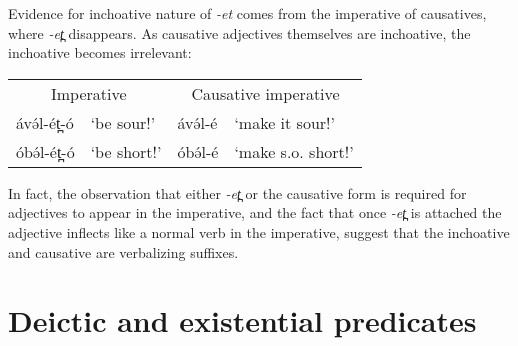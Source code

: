 Evidence for inchoative nature of \textit{-et} comes from the imperative of causatives, where \textit{-et̪} disappears. As causative adjectives themselves are inchoative, the inchoative becomes irrelevant:

\ea	\begin{tabular}[t]{llll}
	\multicolumn{2}{c}{Imperative} & \multicolumn{2}{c}{Causative imperative} \\
ávə́l-ét̪-ó	& ‘be sour!’	& ávə́l-é	& ‘make it sour!’\\
óbə́l-ét̪-ó	& ‘be short!’	&  óbə́l-é	& ‘make s.o. short!’\\
\end{tabular}
\z 
In fact, the observation that either \textit{-et̪} or the causative form is required for adjectives to appear in the imperative, and the fact that once \textit{-et̪} is attached the adjective inflects like a normal verb in the imperative, suggest that the inchoative and causative are verbalizing suffixes. %





	 

\section{Deictic and existential predicates}\label{existcop}

